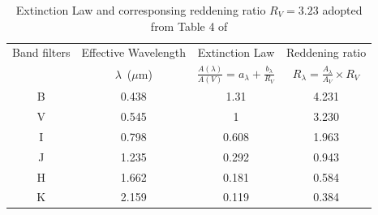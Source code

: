 
	\begin{table}[ht]
		\caption{Extinction Law and corresponsing reddening ratio $R_V = 3.23$ adopted from Table 4 of \cite{2007fouque} }
		\centering
		\vspace*{3mm}
		\begin{tabular}{c c c c}
			\hline
			Band filters & Effective Wavelength  &  Extinction Law & Reddening ratio \\ 
			 & \mbox{$\lambda$ ($\mu$m)} & \small{$\frac{A(\lambda)}{A(V)} = a_{\lambda} + \frac{b_\lambda}{R_V}$} & \small{$R_\lambda = \frac{A_\lambda}{A_V} \times R_V$}\\
			\hline 
			B & 0.438 & 1.31  & 4.231\\
			V & 0.545 & 1     & 3.230\\
			I & 0.798 & 0.608 & 1.963\\
			J & 1.235 & 0.292 & 0.943\\
			H & 1.662 & 0.181 & 0.584\\
			K & 2.159 & 0.119 & 0.384\\
			\hline 
			\end{tabular}
		  \label{fouque}
	\end{table}

  
